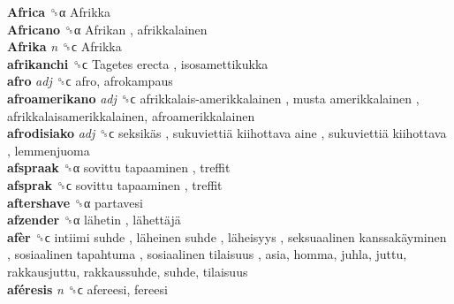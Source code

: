 \textbf{Africa} ␝α   Afrikka   \\
\textbf{Africano} ␝α   Afrikan , afrikkalainen  \\
\textbf{Afrika} \emph{n}  ␝ϲ   Afrikka   \\
\textbf{afrikanchi} ␝ϲ   Tagetes erecta , isosamettikukka  \\
\textbf{afro} \emph{adj}  ␝ϲ  afro, afrokampaus  \\
\textbf{afroamerikano} \emph{adj}  ␝ϲ   afrikkalais-amerikkalainen ,  musta amerikkalainen , afrikkalaisamerikkalainen, afroamerikkalainen  \\
\textbf{afrodisiako} \emph{adj}  ␝ϲ   seksikäs ,  sukuviettiä kiihottava aine ,  sukuviettiä kiihottava , lemmenjuoma  \\
\textbf{afspraak} ␝α   sovittu tapaaminen , treffit  \\
\textbf{afsprak} ␝ϲ   sovittu tapaaminen , treffit  \\
\textbf{aftershave} ␝α  partavesi  \\
\textbf{afzender} ␝α   lähetin ,  lähettäjä   \\
\textbf{afèr} ␝ϲ   intiimi suhde ,  läheinen suhde ,  läheisyys ,  seksuaalinen kanssakäyminen ,  sosiaalinen tapahtuma ,  sosiaalinen tilaisuus , asia, homma, juhla, juttu, rakkausjuttu, rakkaussuhde, suhde, tilaisuus  \\
\textbf{aféresis} \emph{n}  ␝ϲ  afereesi, fereesi  \\
